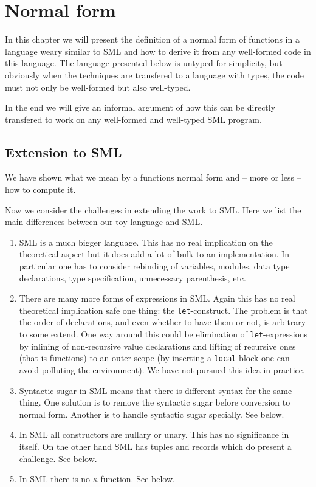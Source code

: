 \chapter{Normal form}\label{chap:normal-form}
In this chapter we will present the definition of a normal form of functions in
a language weary similar to SML and how to derive it from any well-formed code
in this language. The language presented below is untyped for simplicity, but
obviously when the techniques are transfered to a language with types, the code
must not only be well-formed but also well-typed.

In the end we will give an informal argument of how this can be directly
transfered to work on any well-formed and well-typed SML program.



\section{Extension to SML}

We have shown what we mean by a functions normal form and -- more or less -- how
to compute it.

Now we consider the challenges in extending the work to SML. Here we list the
main differences between our toy language and SML.

\begin{enumerate}
\item SML is a much bigger language. This has no real implication on the
  theoretical aspect but it does add a lot of bulk to an implementation. In
  particular one has to consider rebinding of variables, modules, data type
  declarations, type specification, unnecessary parenthesis, etc.
\item There are many more forms of expressions in SML. Again this has no real
  theoretical implication safe one thing: the \texttt{let}-construct. The
  problem is that the order of declarations, and even whether to have them or
  not, is arbitrary to some extend. One way around this could be elimination of
  \texttt{let}-expressions by inlining of non-recursive value declarations and
  lifting of recursive ones (that is functions) to an outer scope (by inserting
  a \texttt{local}-block one can avoid polluting the environment). We have not
  pursued this idea in practice.
\item Syntactic sugar in SML means that there is different syntax for the same
  thing. One solution is to remove the syntactic sugar before conversion to
  normal form. Another is to handle syntactic sugar specially. See
   below.
\item In SML all constructors are nullary or unary. This has no significance in
  itself. On the other hand SML has tuples and records which do present a
  challenge. See  below.
\item In SML there is no $\kappa$-function. See 
  below.
\end{enumerate}

